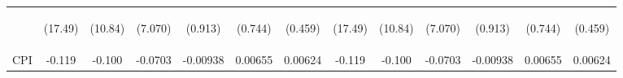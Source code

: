 \documentclass[]{article}
\begin{document}
\begin{center}
\begin{tabular}{lcccccccccccc}
\vspace{4pt} & \begin{footnotesize}(17.49)\end{footnotesize} & \begin{footnotesize}(10.84)\end{footnotesize} & \begin{footnotesize}(7.070)\end{footnotesize} & \begin{footnotesize}(0.913)\end{footnotesize} & \begin{footnotesize}(0.744)\end{footnotesize} & \begin{footnotesize}(0.459)\end{footnotesize} & \begin{footnotesize}(17.49)\end{footnotesize} & \begin{footnotesize}(10.84)\end{footnotesize} & \begin{footnotesize}(7.070)\end{footnotesize} & \begin{footnotesize}(0.913)\end{footnotesize} & \begin{footnotesize}(0.744)\end{footnotesize} & \begin{footnotesize}(0.459)\end{footnotesize} \\
CPI & -0.119 & -0.100 & -0.0703 & -0.00938 & 0.00655 & 0.00624 & -0.119 & -0.100 & -0.0703 & -0.00938 & 0.00655 & 0.00624 \\

\end{tabular}
\end{center}
\end{document}

